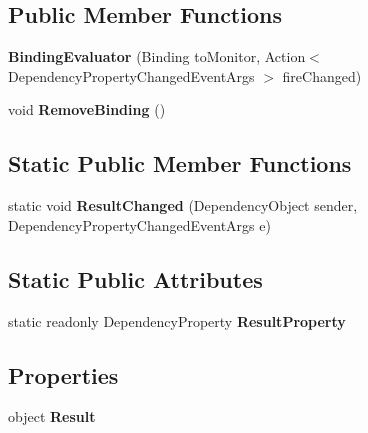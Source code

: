 \subsection*{Public Member Functions}
\begin{DoxyCompactItemize}
\item 
\hypertarget{class_cloud_api_public_1_1_event_message_receiver_1_1_binding_evaluator_a0cb9ea71e6fa4d7991ee47cf74797151}{{\bfseries Binding\-Evaluator} (Binding to\-Monitor, Action$<$ Dependency\-Property\-Changed\-Event\-Args $>$ fire\-Changed)}\label{class_cloud_api_public_1_1_event_message_receiver_1_1_binding_evaluator_a0cb9ea71e6fa4d7991ee47cf74797151}

\item 
\hypertarget{class_cloud_api_public_1_1_event_message_receiver_1_1_binding_evaluator_a165a8f5e96ded9de8ccce13b5be01ef5}{void {\bfseries Remove\-Binding} ()}\label{class_cloud_api_public_1_1_event_message_receiver_1_1_binding_evaluator_a165a8f5e96ded9de8ccce13b5be01ef5}

\end{DoxyCompactItemize}
\subsection*{Static Public Member Functions}
\begin{DoxyCompactItemize}
\item 
\hypertarget{class_cloud_api_public_1_1_event_message_receiver_1_1_binding_evaluator_aa6d5ec8fb84eaf32b39dc8fb1644434c}{static void {\bfseries Result\-Changed} (Dependency\-Object sender, Dependency\-Property\-Changed\-Event\-Args e)}\label{class_cloud_api_public_1_1_event_message_receiver_1_1_binding_evaluator_aa6d5ec8fb84eaf32b39dc8fb1644434c}

\end{DoxyCompactItemize}
\subsection*{Static Public Attributes}
\begin{DoxyCompactItemize}
\item 
static readonly Dependency\-Property {\bfseries Result\-Property}
\end{DoxyCompactItemize}
\subsection*{Properties}
\begin{DoxyCompactItemize}
\item 
\hypertarget{class_cloud_api_public_1_1_event_message_receiver_1_1_binding_evaluator_a4cc2aee7740ef07eb1d4e4ba03356a80}{object {\bfseries Result}}\label{class_cloud_api_public_1_1_event_message_receiver_1_1_binding_evaluator_a4cc2aee7740ef07eb1d4e4ba03356a80}

\end{DoxyCompactItemize}


